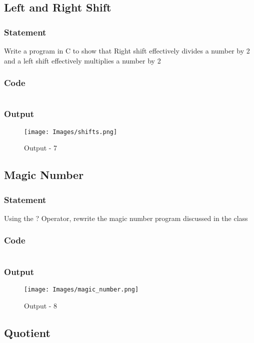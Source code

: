 \pagebreak
\subsection{Left and Right Shift}

\subsubsection{Statement}
Write a program in C to show that Right shift effectively divides a number by 2 and a left shift
effectively multiplies a number by 2

\subsubsection{Code}
\inputminted[]{c}{./code/shifts.cpp}
\subsubsection{Output}
\begin{figure}[H]
  \centering
  \texttt{[image: Images/shifts.png]}
  \label{Output-7}
  \caption{Output - 7}
\end{figure}


\pagebreak
\subsection{Magic Number}

\subsubsection{Statement}
Using the ? Operator, rewrite the magic number program discussed in the class

\subsubsection{Code}
\inputminted[]{c}{'./code/magic_number.cpp'}
\subsubsection{Output}
\begin{figure}[!htb]
  \centering
  \texttt{[image: Images/magic\_number.png]}
  \label{output-8}
  \caption{Output - 8}
\end{figure}


\pagebreak
\subsection{Quotient}

